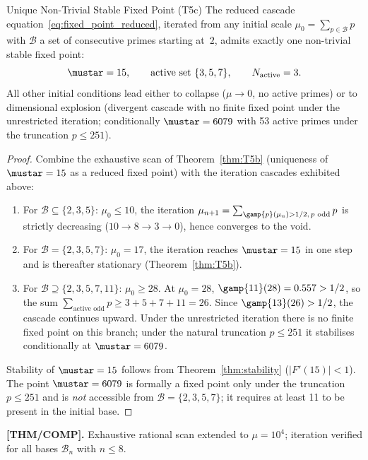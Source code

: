 \documentclass[12pt,a4paper]{article}
\begin{document}
\begin{thmbox}{Unique Non-Trivial Stable Fixed Point (T5c)}
\label{thm:T5c}
The reduced cascade equation~\eqref{eq:fixed_point_reduced}, iterated
from any initial scale $\mu_0 = \sum_{p \in \mathcal{B}} p$ with
$\mathcal{B}$ a set of consecutive primes starting at~$2$, admits
exactly one non-trivial stable fixed point:
\begin{equation}
  \mustar = 15, \qquad
  \text{active set } \{3, 5, 7\}, \qquad
  N_{\rm active} = 3.
  \label{eq:unique_stable}
\end{equation}
All other initial conditions lead either to collapse
($\mu \to 0$, no active primes) or to dimensional explosion
(divergent cascade with no finite fixed point under the unrestricted
iteration; conditionally $\mustar = 6079$ with 53 active primes
under the truncation $p \leq 251$).

\begin{proof}
Combine the exhaustive scan of
Theorem~\ref{thm:T5b} (uniqueness of $\mustar = 15$ as a reduced
fixed point) with the iteration cascades exhibited above:
\begin{enumerate}[nosep]
\item For $\mathcal{B} \subseteq \{2,3,5\}$: $\mu_0 \leq 10$, the
  iteration $\mu_{n+1} = \sum_{\gamp{p}(\mu_n) > 1/2,\, p \text{ odd}} p$
  is strictly decreasing ($10 \to 8 \to 3 \to 0$), hence converges
  to the void.
\item For $\mathcal{B} = \{2,3,5,7\}$: $\mu_0 = 17$, the iteration
  reaches $\mustar = 15$ in one step and is thereafter stationary
  (Theorem~\ref{thm:T5b}).
\item For $\mathcal{B} \supseteq \{2,3,5,7,11\}$: $\mu_0 \geq 28$.
  At $\mu_0 = 28$, $\gamp{11}(28) = 0.557 > 1/2$, so the sum
  $\sum_{\text{active odd}} p \geq 3 + 5 + 7 + 11 = 26$.  Since
  $\gamp{13}(26) > 1/2$, the cascade continues upward.  Under the
  unrestricted iteration there is no finite fixed point on this
  branch; under the natural truncation $p \leq 251$ it stabilises
  conditionally at $\mustar = 6079$.
\end{enumerate}
Stability of $\mustar = 15$ follows from
Theorem~\ref{thm:stability} ($|F'(15)| < 1$).
The point $\mustar = 6079$ is formally a fixed point only
under the truncation $p \leq 251$ and is \emph{not} accessible from
$\mathcal{B} = \{2,3,5,7\}$; it requires at least 11 to be present
in the initial base.
\end{proof}

\noindent\textbf{[THM/COMP].}\;
Exhaustive rational scan extended to $\mu = 10^4$; iteration
verified for all bases $\mathcal{B}_n$ with $n \leq 8$.
\end{thmbox}
\end{document}
